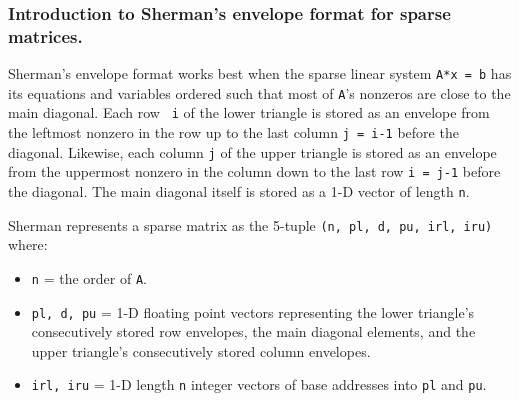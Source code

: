 \subsubsection{Introduction to Sherman's envelope format for sparse  
matrices.}

Sherman's envelope format works best when the sparse linear system
{\tt A*x = b} has its equations and variables ordered such that most
of {\tt A}'s nonzeros are close to the main diagonal.  Each row {\tt
i} of the lower triangle is stored as an envelope from the leftmost
nonzero in the row up to the last column {\tt j = i-1} before the
diagonal.  Likewise, each column {\tt j} of the upper triangle is
stored as an envelope from the uppermost nonzero in the column down to
the last row {\tt i = j-1} before the diagonal.  The main diagonal
itself is stored as a 1-D vector of length {\tt n}.

Sherman represents a sparse matrix as the 5-tuple {\tt (n, pl, d, pu,
irl, iru)} where:
\begin{itemize}
\item   {\tt n} = the order of {\tt A}.

\item   {\tt pl, d, pu} = 1-D floating point vectors representing
        the lower triangle's consecutively stored row envelopes,
        the main diagonal elements,
        and the upper triangle's consecutively stored column envelopes.

\item   {\tt irl, iru} = 1-D length {\tt n} integer vectors of
        base addresses into {\tt pl} and {\tt pu}.
\end{itemize}

